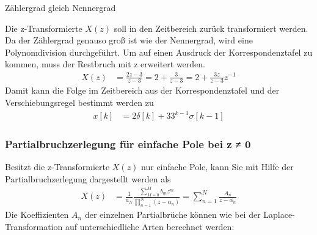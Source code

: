 \begin{example}{Zählergrad gleich Nennergrad}
\label{example:beispiel-zuxe4hlergrad-gleich-nennergrad}

Die z-Transformierte \(X(z)\) soll in den Zeitbereich zurück transformiert werden. Da der Zählergrad genauso groß ist wie der Nennergrad, wird eine Polynomdivision durchgeführt. Um auf einen Ausdruck der Korrespondenztafel zu kommen, muss der Restbruch mit z erweitert werden.
\begin{align*}
X(z) &= \frac{2  z - 3}{z - 3} = 2 + \frac{3}{z - 3} = 2 + \frac{3  z}{z - 3}  z^{- 1} 
\end{align*}
Damit kann die Folge im Zeitbereich aus der Korrespondenztafel und der Verschiebungsregel bestimmt werden zu
\begin{align*}
x[ k] &= 2  \delta[ k] + 3  3^{k - 1}  \sigma[ k - 1] 
\end{align*}
\end{example}

\textbf{\hfill\break
}

\subsubsection{Partialbruchzerlegung für einfache Pole bei z ≠ 0}\label{sec:partialbruchzerlegung-fuxfcr-einfache-pole-bei-z-0}

Besitzt die z-Transformierte \(X(z)\) nur einfache Pole, kann Sie mit Hilfe der Partialbruchzerlegung dargestellt werden als
\begin{align}
X(z) &= \frac{1}{a_{N}}  \frac{\sum\limits_{M = 0}^{M}{b_{m}  z^{m}}}{\prod\limits_{n = 1}^{N}\left( z - \alpha_{n} \right)} = \sum\limits_{n = 1}^{N}\frac{A_{n}}{z - \alpha_{n}} \label{eq:5.91}
\end{align}
Die Koeffizienten \(A_{n}\) der einzelnen Partialbrüche können wie bei der Laplace-Transformation auf unterschiedliche Arten berechnet werden:

